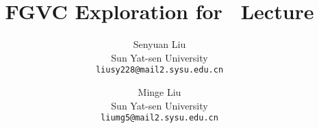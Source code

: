 \documentclass[10pt,twocolumn,letterpaper]{article}
\title{FGVC Exploration for \confName~Lecture}
\author{
Senyuan Liu\\
Sun Yat-sen University\\
{\tt\small liusy228@mail2.sysu.edu.cn}
\and
Minge Liu\\
Sun Yat-sen University\\
{\tt\small liumg5@mail2.sysu.edu.cn}
}
\begin{document}
\twocolumn[
\maketitle

]
\clearpage





\clearpage %
{
    \small
    
    
}

% 
\end{document}
